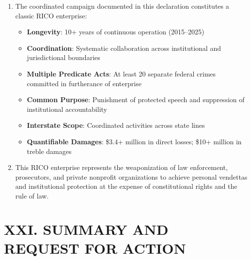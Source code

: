 \documentclass[12pt,letterpaper]{article}
\begin{document}
\begin{enumerate}
\textbf{E. Conclusion: RICO Enterprise Liability}

\item The coordinated campaign documented in this declaration constitutes a classic RICO enterprise:

\begin{itemize}
\item \textbf{Longevity}: 10+ years of continuous operation (2015--2025)
\item \textbf{Coordination}: Systematic collaboration across institutional and jurisdictional boundaries
\item \textbf{Multiple Predicate Acts}: At least 20 separate federal crimes committed in furtherance of enterprise
\item \textbf{Common Purpose}: Punishment of protected speech and suppression of institutional accountability
\item \textbf{Interstate Scope}: Coordinated activities across state lines
\item \textbf{Quantifiable Damages}: \$3.4+ million in direct losses; \$10+ million in treble damages
\end{itemize}

\item This RICO enterprise represents the weaponization of law enforcement, prosecutors, and private nonprofit organizations to achieve personal vendettas and institutional protection at the expense of constitutional rights and the rule of law.

\end{enumerate}
\section*{XXI. SUMMARY AND REQUEST FOR ACTION}
\end{document}
